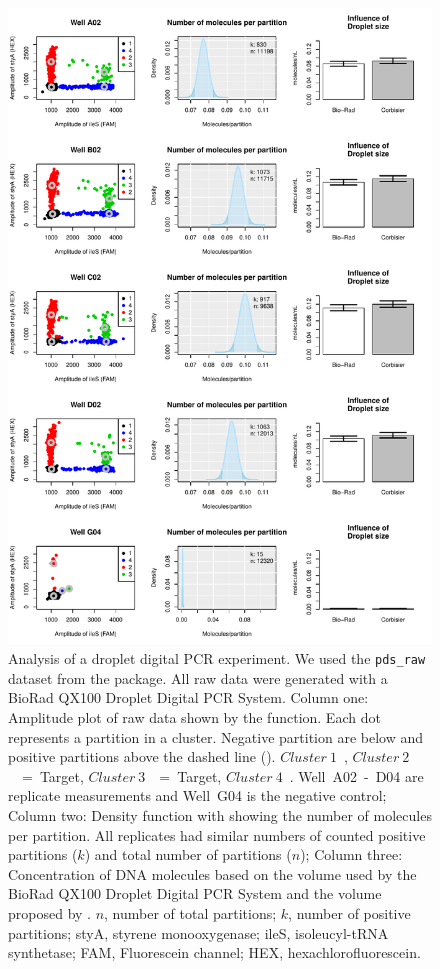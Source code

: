 \begin{figure}[htbp]
\centering
  \includegraphics[clip=true, trim=0.1cm 0.4cm 0.7cm 0.3cm, width=12cm]{figures/dpcR_bioamp.pdf}
    \caption{Analysis of a droplet digital PCR experiment. We used the 
\texttt{pds\_raw} dataset from the  package. All raw data were 
generated with a BioRad QX100 Droplet Digital PCR System. Column one: Amplitude 
plot of raw data shown by the  function. Each dot represents a 
partition in a cluster. Negative partition are below and positive partitions above the 
dashed line ({\textbf{\textendash\textendash}}). 
$Cluster~1$~\textcolor{black}{\textbf{\textbullet}}, 
$Cluster~2$~\textcolor{red}{\textbf{\textbullet}}~=~Target, 
$Cluster~3$~\textcolor{green}{\textbf{\textbullet}}~=~Target, 
$Cluster~4$~\textcolor{blue}{\textbf{\textbullet}}. Well~A02~-~D04 are 
replicate measurements and Well~G04 is the negative control; Column two: Density 
function with showing the number of molecules per partition. All replicates had 
similar numbers of counted positive partitions ($k$) and total number of 
partitions ($n$); Column three: Concentration of DNA molecules based on the 
volume used by the BioRad QX100 Droplet Digital PCR System and the volume 
proposed by \citet{corbisier_2015}. $n$, number of total partitions; $k$, number 
of positive partitions; styA, styrene monooxygenase; ileS, isoleucyl-tRNA 
synthetase; FAM, Fluorescein channel; HEX, hexachlorofluorescein. 
    }  \label{figure:dpcR_bioamp}
\end{figure}

